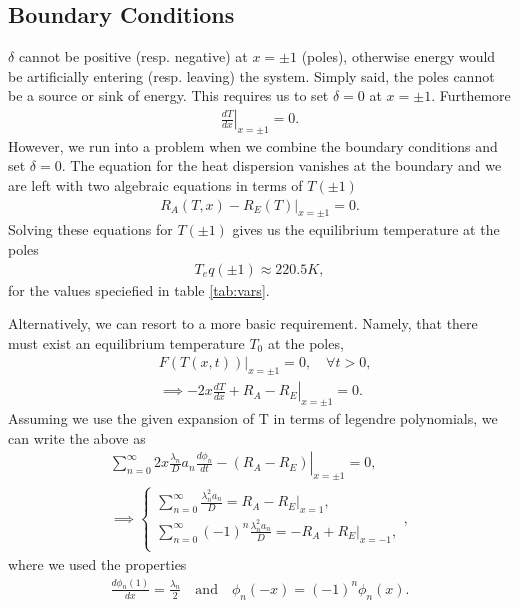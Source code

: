 \subsection{Boundary Conditions}
    $\delta$ cannot be positive (resp. negative) at $x = \pm 1$ (poles), otherwise energy would be
    artificially entering (resp. leaving) the system. Simply said, the poles cannot be a source or sink of energy.
    This requires us to set $\delta = 0$ at $x = \pm 1$. Furthemore 
    \begin{align*}
            \left.\frac{d T}{dx}\right|_{x = \pm 1} = 0.
    \label{eq:bcs}
    \end{align*}
    However, we run into a problem when we combine the boundary conditions and set $\delta = 0$. The 
    equation for the heat dispersion vanishes at the boundary and we are left with two algebraic equations in terms 
    of $T(\pm 1)$
    \begin{align*}
        \left.R_A(T, x) - R_E(T)\right|_{x=\pm1} = 0.  
    \end{align*} 
    Solving these equations for $T(\pm 1)$ gives us the equilibrium temperature at the poles
    \begin{align*}
        T_eq(\pm 1) \approx 220.5 K,
    \end{align*}
    for the values speciefied in table \ref{tab:vars}.
    
    Alternatively, we can resort to a more basic requirement. Namely, that there must exist an equilibrium temperature $T_0$ at the poles,
    \begin{align*}
        &\left.F(T(x, t))\right|_{x=\pm 1} = 0, \quad \forall t > 0,\\
        &\implies \left.-2x\frac{dT}{dx} + R_A - R_E\right|_{x=\pm 1} = 0.
    \end{align*}
    Assuming we use the given expansion of T in terms of legendre polynomials, we can write the above as
    \begin{align*}
        \sum_{n=0}^{\infty} \left. 2x\frac{\lambda_n}{D} a_n\frac{d \phi_n}{dt} -(R_A - R_E) \right|_{x=\pm 1}= 0,\\
        \implies
        \begin{cases}
            \sum_{n=0}^{\infty} \frac{\lambda_n^2 a_n}{D} = \left. R_A - R_E \right|_{x=1},\\
            \sum_{n=0}^{\infty} (-1)^n\frac{\lambda_n^2 a_n}{D} = \left. -R_A + R_E \right|_{x=-1},\\
        \end{cases},
    \end{align*}
    where we used the properties 
    \begin{align*}
        \frac{d\phi_n(1)}{dx} = \frac{\lambda_n}{2} \quad \textrm{and} \quad \phi_n(-x) = (-1)^n \phi_n(x).
    \end{align*}

